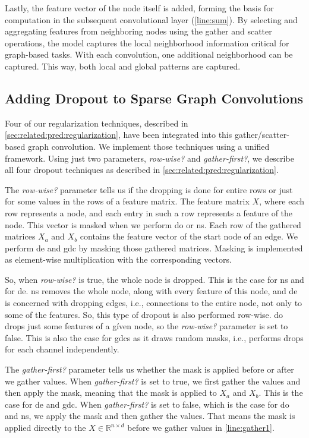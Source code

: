 Lastly, the feature vector of the node itself is added, forming the basis for computation in the subsequent convolutional layer (\cref{line:sum}).
By selecting and aggregating features from neighboring nodes using the gather and scatter operations, the model captures the local neighborhood information critical for graph-based tasks.
With each convolution, one additional neighborhood can be captured.
This way, both local and global patterns are captured.

\subsection{Adding Dropout to Sparse Graph Convolutions}
\label{sec:implement:gnndropout:dropout}
Four of our regularization techniques, described in \cref{sec:related:pred:regularization}, have been integrated into this gather/scatter-based graph convolution.
We implement those techniques using a unified framework.
Using just two parameters, \textit{row-wise?} and \textit{gather-first?}, we describe all four dropout techniques as described in \cref{sec:related:pred:regularization}.

The \textit{row-wise?} parameter tells us if the dropping is done for entire rows or just for some values in the rows of a feature matrix.
The feature matrix $X$, where each row represents a node, and each entry in such a row represents a feature of the node.
This vector is masked when we perform \ac{do} or \ac{ns}.
Each row of the gathered matrices $X_a$ and $X_b$ contains the feature vector of the start node of an edge.
We perform \ac{de} and \ac{gdc} by masking those gathered matrices.
Masking is implemented as element-wise multiplication with the corresponding vectors.

So, when \textit{row-wise?} is true, the whole node is dropped.
This is the case for \acf{ns} and for \acf{de}. \Ac{ns} removes the whole node, along with every feature of this node, and \ac{de} is concerned with dropping edges, i.e., connections to the entire node, not only to some of the features.
So, this type of dropout is also performed row-wise.
\Acf{do} drops just some features of a gíven node, so the \textit{row-wise?} parameter is set to false.
This is also the case for \acp{gdc} as it draws random masks, i.e., performs drops for each channel independently.


The \textit{gather-first?} parameter tells us whether the mask is applied before or after we gather values.
When \textit{gather-first?} is set to true, we first gather the values and then apply the mask, meaning that the mask is applied to $X_{a}$ and $X_b$.
This is the case for \ac{de} and \ac{gdc}.
When \textit{gather-first?} is set to false, which is the case for \ac{do} and \ac{ns}, we apply the mask and then gather the values.
That means the mask is applied directly to the $X \in \mathbb{R}^{n \times d}$ before we gather values in \cref{line:gather1}.

